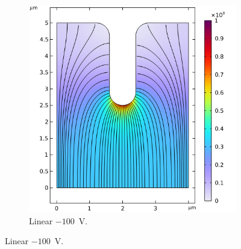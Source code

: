 \begin{refsection}
\begin{figure}[H]
\begin{subfigure}[b]{0.45\linewidth}
        \includegraphics[width=\linewidth]{Chapter7/Figs/Raster/Comsol/-100_normE_smol.png}
        \caption{Linear $-100$~\si{\volt}.}
        \label{fig:c_-100_lin_norme}
    \end{subfigure}
    

\end{figure}
\end{refsection}
